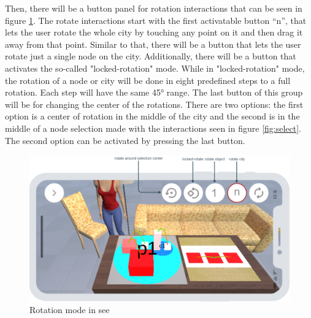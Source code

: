 Then, there will be a button panel for rotation interactions that can be seen in figure \ref{fig:rotate_proto}.
The rotate interactions start with the first activatable button \enquote{n}, that lets the user rotate the whole \gls{city} by touching any point on it and then drag it away from that point.
Similar to that, there will be a button that lets the user rotate just a single \gls{node} on the \gls{city}.
Additionally, there will be a button that activates the so-called "locked-rotation" mode.
While in "locked-rotation" mode, the rotation of a \gls{node} or \gls{city} will be done in eight predefined steps to a full rotation.
Each step will have the same 45° range.
The last button of this group will be for changing the center of the rotations. 
There are two options: the first option is a center of rotation in the middle of the \gls{city} and the second is in the middle of a \gls{node} selection made with the interactions seen in figure \ref{fig:select}.
The second option can be activated by pressing the last button.

\begin{figure}[htb]
    \centering
    \includegraphics[width=1\textwidth]{Concept/img/menu4.png}
    \caption{Rotation mode in \gls{see}}\label{fig:rotate_proto}
\end{figure}

